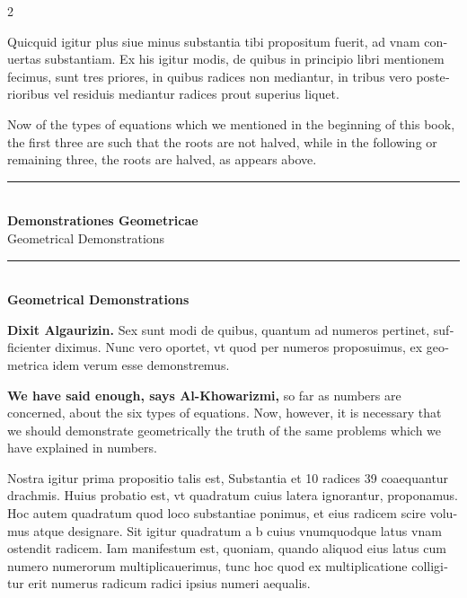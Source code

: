 \documentclass[11pt,a4paper,twoside]{book}
\newcommand{\latincolumn}[1]{\textlatin{\small #1}}
\begin{document}
\begin{paracol}{2}
\switchcolumn*

\latincolumn{Quicquid igitur plus siue minus substantia tibi propositum fuerit, ad vnam conuertas substantiam. Ex his igitur modis, de quibus in principio libri mentionem fecimus, sunt tres priores, in quibus radices non mediantur, in tribus vero posterioribus vel residuis mediantur radices prout superius liquet.}

\switchcolumn

Now of the types of equations which we mentioned in the beginning of this book, the first three are such that the roots are not halved, while in the following or remaining three, the roots are halved, as appears above.

\switchcolumn*

\begin{center}
\color{chapterline}\rule{0.8\columnwidth}{1pt}\\[0.3cm]
{\normalsize\bfseries\color{titlecolor} Demonstrationes Geometricae}\\[0.2cm]
\latincolumn{Geometrical Demonstrations}
\end{center}

\switchcolumn

\begin{center}
\color{chapterline}\rule{0.8\columnwidth}{1pt}\\[0.3cm]
{\normalsize\bfseries\color{titlecolor} Geometrical Demonstrations}\\[0.2cm]
\end{center}

\switchcolumn*

\latincolumn{\textbf{Dixit Algaurizin.} Sex sunt modi de quibus, quantum ad numeros pertinet, sufficienter diximus. Nunc vero oportet, vt quod per numeros proposuimus, ex geometrica idem verum esse demonstremus.}

\switchcolumn

\textbf{We have said enough, says Al-Khowarizmi,} so far as numbers are concerned, about the six types of equations. Now, however, it is necessary that we should demonstrate geometrically the truth of the same problems which we have explained in numbers.

\switchcolumn*

\latincolumn{Nostra igitur prima propositio talis est, Substantia et 10 radices 39 coaequantur drachmis. Huius probatio est, vt quadratum cuius latera ignorantur, proponamus. Hoc autem quadratum quod loco substantiae ponimus, et eius radicem scire volumus atque designare. Sit igitur quadratum a b cuius vnumquodque latus vnam ostendit radicem. Iam manifestum est, quoniam, quando aliquod eius latus cum numero numerorum multiplicauerimus, tunc hoc quod ex multiplicatione colligitur erit numerus radicum radici ipsius numeri aequalis.}


\end{paracol}
\end{document}

